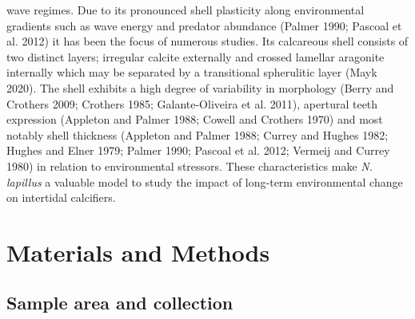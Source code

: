 \documentclass[smallextended]{svjour3}       %
\begin{document}
wave regimes. Due to its pronounced shell plasticity along environmental
gradients such as wave energy and predator abundance (Palmer 1990;
Pascoal et al. 2012) it has been the focus of numerous studies. Its
calcareous shell consists of two distinct layers; irregular calcite
externally and crossed lamellar aragonite internally which may be
separated by a transitional spherulitic layer (Mayk 2020). The shell
exhibits a high degree of variability in morphology (Berry and Crothers
2009; Crothers 1985; Galante-Oliveira et al. 2011), apertural teeth
expression (Appleton and Palmer 1988; Cowell and Crothers 1970) and most
notably shell thickness (Appleton and Palmer 1988; Currey and Hughes
1982; Hughes and Elner 1979; Palmer 1990; Pascoal et al. 2012; Vermeij
and Currey 1980) in relation to environmental stressors. These
characteristics make \emph{N. lapillus} a valuable model to study the
impact of long-term environmental change on intertidal calcifiers.

\hypertarget{materials-and-methods}{%
\section{Materials and Methods}\label{materials-and-methods}}

\hypertarget{sample-area-and-collection}{%
\subsection{Sample area and
collection}\label{sample-area-and-collection}}
\end{document}
